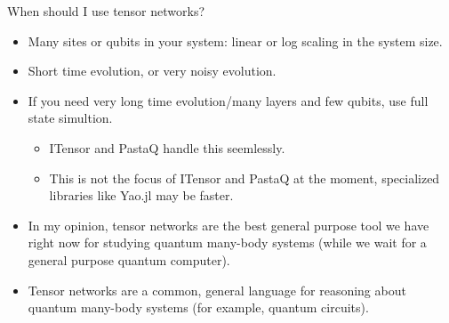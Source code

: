 \begin{frame}{When should I use tensor networks?}

\begin{itemize}[<+->]

  \item Many sites or qubits in your system: linear or log scaling in the system size.
  \item Short time evolution, or very noisy evolution.
  \item If you need very long time evolution/many layers and few qubits, use full state simultion.
    
  \begin{itemize}[<+->]

    \item ITensor and PastaQ handle this seemlessly.
    \item This is not the focus of ITensor and PastaQ at the moment, specialized libraries like Yao.jl may be faster.

  \end{itemize}

  \item In my opinion, tensor networks are the best general purpose tool we have right now for studying quantum many-body systems (while we wait for a general purpose quantum computer).
  \item Tensor networks are a common, general language for reasoning about quantum many-body systems (for example, quantum circuits).

\end{itemize}


\end{frame}
